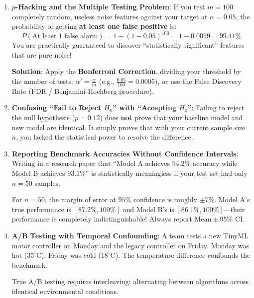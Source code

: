\begin{warning}
\begin{enumerate}
    \item \textbf{$p$-Hacking and the Multiple Testing Problem}:
    If you test $m = 100$ completely random, useless noise features against your target at $\alpha = 0.05$, the probability of getting \textbf{at least one false positive} is:
    \begin{equation}
    P(\text{At least 1 false alarm}) = 1 - (1 - 0.05)^{100} = 1 - 0.0059 = \mathbf{99.41\%}
    \end{equation}
    You are practically guaranteed to discover ``statistically significant'' features that are pure noise! 
    
    \textbf{Solution}: Apply the \textbf{Bonferroni Correction}, dividing your threshold by the number of tests: $\alpha' = \frac{\alpha}{m}$ (e.g., $\frac{0.05}{100} = 0.0005$), or use the False Discovery Rate (FDR / Benjamini-Hochberg procedure).

    \item \textbf{Confusing ``Fail to Reject $H_0$'' with ``Accepting $H_0$''}:
    Failing to reject the null hypothesis ($p = 0.12$) does \textbf{not} prove that your baseline model and new model are identical. It simply proves that with your current sample size $n$, you lacked the statistical power to resolve the difference. 

    \item \textbf{Reporting Benchmark Accuracies Without Confidence Intervals}:
    Writing in a research paper that ``Model A achieves $94.2\%$ accuracy while Model B achieves $93.1\%$'' is statistically meaningless if your test set had only $n = 50$ samples. 
    
    For $n = 50$, the margin of error at $95\%$ confidence is roughly $\pm 7\%$. Model A's true performance is $[87.2\%, 100\%]$ and Model B's is $[86.1\%, 100\%]$---their performance is completely indistinguishable! Always report $\text{Mean} \pm 95\%\text{ CI}$.

    \item \textbf{A/B Testing with Temporal Confounding}:
    A team tests a new TinyML motor controller on Monday and the legacy controller on Friday. Monday was hot ($35^\circ\text{C}$); Friday was cold ($18^\circ\text{C}$). The temperature difference confounds the benchmark. 
    
    True A/B testing requires interleaving: alternating between algorithms across identical environmental conditions.
\end{enumerate}
\end{warning}


